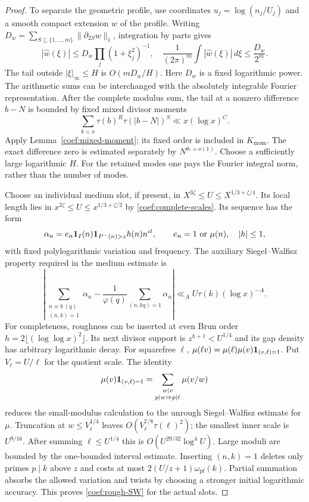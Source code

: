\begin{proof}
To separate the geometric profile, use coordinates
$u_j=\log(n_j/U_j)$ and a smooth compact extension $w$ of the profile.
Writing
$D_w=\sum_{S\subseteq\{1,\ldots,m\}}\|\partial_{2S}w\|_1$,
integration by parts gives
\[
 |\widehat w(\xi)|\le D_w\prod_j(1+\xi_j^2)^{-1},
 \quad \frac1{(2\pi)^m}\int|\widehat w(\xi)|\,d\xi
 \le\frac{D_w}{2^m}.
\]
The tail outside $|\xi|_\infty\le H$ is $O(mD_w/H)$.
Here $D_w$ is a fixed logarithmic power.  The arithmetic sums can be
interchanged with the absolutely integrable Fourier representation.
After the complete modulus sum, the tail at a nonzero difference
$b-N$ is bounded by fixed mixed divisor moments
\[
 \sum_{b\asymp x}\tau(b)^R\tau(|b-N|)^S
 \ll x(\log x)^C.
\]
Apply Lemma~\ref{coef:mixed-moment}; its fixed order is included in
$K_{\mathrm{mom}}$.  The exact
difference zero is estimated separately by $N^{\theta_*+o(1)}$.
Choose a sufficiently large logarithmic $H$.  For the retained modes
one pays the Fourier integral norm, rather than the number of modes.

Choose an individual medium slot, if present, in
$X^{3\zeta}\le U\le X^{1/3+\zeta/4}$.
Its local length lies in
$x^{2\zeta}\le U\le x^{1/3+\zeta/2}$ by
\eqref{coef:complete-scales}.  Its sequence has the form
\[
 \alpha_n=e_n\mathbf 1_I(n)\mathbf 1_{P^-(n)>z}h(n)n^{it},
 \qquad e_n=1\text{ or }\mu(n),\quad |h|\le1,
\]
with fixed polylogarithmic variation and frequency.  The auxiliary
Siegel--Walfisz property required in the medium estimate is
\begin{equation}
 \left|\sum_{\substack{n\equiv b\ (q)\\(n,k)=1}}\alpha_n
 -\frac1{\varphi(q)}\sum_{(n,kq)=1}\alpha_n\right|
 \ll_A U\tau(k)(\log x)^{-A}.
 \label{coef:rough-SW}
\end{equation}
For completeness, roughness can be inserted at even Brun order
$h=2\lfloor(\log\log x)^2\rfloor$.  Its next divisor support is
$z^{h+1}<U^{1/4}$ and its gap density has arbitrary logarithmic decay.
For squarefree $\ell$,
$\mu(\ell v)=\mu(\ell)\mu(v)\mathbf 1_{(v,\ell)=1}$.
Put $V_\ell=U/\ell$ for the quotient scale. The identity
\[
 \mu(v)\mathbf 1_{(v,\ell)=1}
 =\sum_{\substack{w\mid v\\p\mid w\Rightarrow p\mid\ell}}\mu(v/w)
\]
reduces the small-modulus calculation to the unrough
Siegel--Walfisz estimate for $\mu$.  Truncation at $w\le V_\ell^{1/4}$
leaves $O(V_\ell^{7/8}\tau(\ell)^2)$; the smallest inner scale is $U^{9/16}$.
After summing $\ell\le U^{1/4}$ this is
$O(U^{29/32}\log^4U)$.  Large moduli are bounded by the one-bounded
interval estimate.  Inserting $(n,k)=1$ deletes only primes $p\mid k$
above $z$ and costs at most
$2(U/z+1)\omega_{\mathrm{pf}}(k)$.  Partial summation absorbs the allowed variation
and twists by choosing a stronger initial logarithmic accuracy.  This proves \eqref{coef:rough-SW} for the actual slots.


\end{proof}
